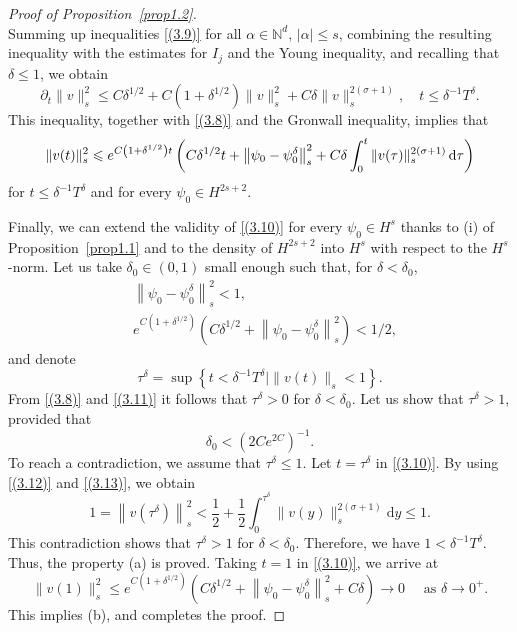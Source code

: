 \documentclass[review]{elsarticle}
\theoremstyle{dotless}
\def\d{{\,\rm d}}
\def \leq{\leqslant}
\numberwithin{equation}{section}
\begin{document}
\begin{proof}[Proof of Proposition~\ref{prop1.2}]
$$$$
Summing up inequalities \eqref{(3.9)} for all $\alpha \in \mathbb{N}^d,\,|\alpha| \leq s$, combining the resulting inequality with the estimates for $I_j$ and the Young inequality, and recalling that $\delta \leq 1$, we obtain
$$
\partial_t\|v\|_s^2 \leq C \delta^{1 / 2}+C\left(1+\delta^{1 / 2}\right)\|v\|_s^2+C \delta\|v\|_s^{2(\sigma+1)}, \quad t \leq \delta^{-1} T^\delta.
$$
This inequality, together with \eqref{(3.8)} and the Gronwall inequality, implies that
\begin{equation}\label{(3.10)}
	\|v(t)\|_s^2 \leq e^{C\left(1+\delta^{1 / 2}\right) t}\left(C \delta^{1 / 2} t+\left\|\psi_0-\psi_0^\delta\right\|_s^2+C \delta \int_0^t\|v(\tau)\|_s^{2(\sigma+1)} \d \tau\right)
\end{equation}
for $t \leq \delta^{-1} T^\delta$ and for every $ \psi_0\in  H^{2s+2}$.  

Finally, we can extend the validity of \eqref{(3.10)} for every $\psi_0 \in H^s$ thanks to (i) of Proposition~\ref{prop1.1} and to the density of $H^{2 s+2}$ into $H^s$ with respect to the $H^s$-norm.
Let us take $\delta_0 \in(0,1)$ small enough such that, for $\delta<\delta_0$,
\begin{align}
	& \left\|\psi_0-\psi_0^\delta\right\|_s^2<1, \label{(3.11)}\\
	& e^{C\left(1+\delta^{1 / 2}\right)}\left(C \delta^{1 / 2}+\left\|\psi_0-\psi_0^\delta\right\|_s^2\right)<1 / 2,\label{(3.12)}
\end{align}
and denote
$$
\tau^\delta=\sup \left\{t<\delta^{-1} T^\delta\mid\|v(t)\|_s<1\right\}.
$$
From \eqref{(3.8)} and \eqref{(3.11)} it follows that $\tau^\delta>0$ for $\delta<\delta_0$. Let us show that $\tau^\delta>1$, provided that
\begin{equation}\label{(3.13)}
	\delta_0<\left(2 C e^{2 C}\right)^{-1} .
\end{equation}
To reach a contradiction, we assume that $\tau^\delta \leq 1$. Let $t=\tau^\delta$ in \eqref{(3.10)}. By using \eqref{(3.12)} and \eqref{(3.13)}, we obtain
$$
1=\left\|v(\tau^\delta)\right\|_s^2<\frac{1}{2}+\frac{1}{2} \int_0^{\tau^\delta}\|v(y)\|_s^{2(\sigma+1)} \mathrm{d} y \leq 1 .
$$
This contradiction shows that $\tau^\delta>1$ for $\delta<\delta_0$. Therefore, we have $1<\delta^{-1} T^\delta$. Thus, the property (a) is proved. Taking $t=1$ in \eqref{(3.10)}, we arrive at
$$
\|v(1)\|_s^2 \leq e^{C\left(1+\delta^{1 / 2}\right)}\left(C \delta^{1 / 2}+\left\|\psi_0-\psi_0^\delta\right\|_s^2+C \delta\right) \rightarrow 0 \quad \text { as } \delta \rightarrow 0^{+} .
$$
This implies (b), and completes the proof.
\end{proof}
\end{document}
